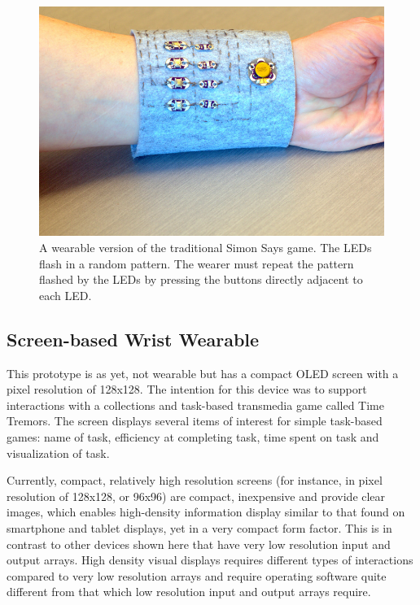 \documentclass{chi-ext}
\begin{document}
\begin{figure}
  \begin{center}
  \includegraphics[width=\columnwidth]{images/P1130375.jpg}
  \caption{A wearable version of the traditional Simon Says game. The LEDs flash in a random pattern. The wearer must repeat the pattern flashed by the LEDs by pressing the buttons directly adjacent to each LED.}
  \label{fig:simonSays}
  \end{center}  
\end{figure}

\subsection{Screen-based Wrist Wearable}
This prototype is as yet, not wearable but has a compact OLED screen with a pixel  resolution of 128x128. The intention for this device was to support interactions with a collections and task-based transmedia game called Time Tremors. The screen displays several items of interest for simple task-based games: name of task, efficiency at completing task, time spent on task and visualization of task.

Currently, compact, relatively high resolution screens (for instance, in pixel resolution of 128x128, or 96x96) are compact, inexpensive and provide clear images, which enables high-density information display similar to that found on smartphone and tablet displays, yet in a very compact form factor. This is in contrast to other devices shown here that have very low resolution input and output arrays. High density visual displays requires different types of interactions compared to very low resolution arrays and require operating software quite different from that which low resolution input and output arrays require.
\end{document}
